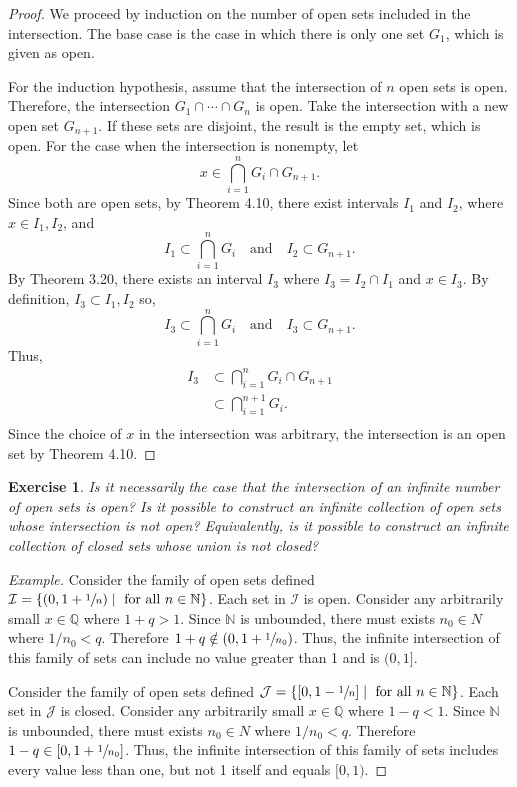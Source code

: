 \documentclass{amsart}
\newtheorem{exercise}[theorem]{Exercise}
\newcommand{\N}{\mathbb N}
\newcommand{\Q}{\mathbb Q}
\newcommand{\1}{\mathds{1}}
\def \N {{\mathbb {N}}}
\numberwithin{equation}{section}
\numberwithin{theorem}{section}
\begin{document}
\begin{proof}
	We proceed by induction on the number of open sets included in the intersection. The base case is the case in which there is only one set $G_1$, which is given as open.
	
	For the induction hypothesis, assume that the intersection of $n$ open sets is open. Therefore, the intersection $G_1 \cap \dotsm \cap G_n$ is open. Take the intersection with a new open set $G_{n+1}$. If these sets are disjoint, the result is the empty set, which is open. For the case when the intersection is nonempty, let $$x\in \bigcap_{i=1}^n G_i \cap G_{n+1}.$$ Since both are open sets, by Theorem 4.10, there exist intervals $I_1$ and $I_2$, where $x\in I_1,I_2$, and $$I_1 \subset \bigcap_{i=1}^n G_i \quad \text {and} \quad I_2 \subset G_{n+1}.$$ By Theorem 3.20, there exists an interval $I_3$ where $I_3 = I_2 \cap I_1$ and $x\in I_3$. By definition, $I_3\subset I_1,I_2$ so, $$I_3 \subset \bigcap_{i=1}^n G_i \quad \text {and} \quad I_3 \subset G_{n+1}.$$ Thus, 
	\[\begin{split}
	I_3 &\subset \bigcap_{i=1}^n G_i \cap G_{n+1}\\
		&\subset \bigcap_{i=1}^{n+1} G_i.\\
	\end{split}\]
	Since the choice of $x$ in the intersection was arbitrary, the intersection is an open set by Theorem 4.10.
\end{proof}


\begin{exercise}  Is it necessarily the case that the intersection of an infinite number of open sets is open? Is it possible to construct an infinite collection of open sets whose intersection is not open?  Equivalently, is it possible to construct an infinite collection of closed sets whose union is not closed?
\end{exercise} 

\begin{proof}[Example]
	Consider the family of open sets defined $\mathcal{I} = \{(0,1 + \sfrac{1}{n})\mid \text{ for all } n\in\N\}$. Each set in $\mathcal{I}$ is open. Consider any arbitrarily small $x\in \Q$ where $1+q> 1$. Since $\N$ is unbounded, there must exists $n_0\in N$ where $1/n_0 < q$. Therefore $1+q \notin (0,1 + \sfrac{1}{n_0})$. Thus, the infinite intersection of this family of sets can include no value greater than 1 and is $(0,1]$.
	
	Consider the family of open sets defined $\mathcal{J} = \{[0,1 - \sfrac{1}{n}]\mid \text{ for all } n\in\N\}$. Each set in $\mathcal{J}$ is closed. Consider any arbitrarily small $x\in \Q$ where $1-q< 1$. Since $\N$ is unbounded, there must exists $n_0\in N$ where $1/n_0 < q$. Therefore $1-q \in [0,1 + \sfrac{1}{n_0}]$. Thus, the infinite intersection of this family of sets includes every value less than one, but not 1 itself and equals $[0,1)$.
\end{proof}
\end{document}
